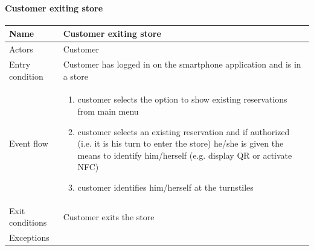 \paragraph{Customer exiting store}
\begin{flushleft}
	\begin{tabular} { | m{3cm} | m{10cm} | }
		\hline
		Name & Customer exiting store\\
		\hline
		Actors & Customer\\
		\hline
		Entry condition & Customer has logged in on the smartphone application and is in a store\\
		\hline
		Event flow & \begin{enumerate}
			\item customer selects the option to show existing reservations from main menu
			\item customer selects an existing reservation and if authorized (i.e. it is his turn to enter the store) he/she is given the means to identify him/herself (e.g. display QR or activate NFC)
			\item customer identifies him/herself at the turnstiles
		\end{enumerate}\\
		\hline
		Exit conditions & Customer exits the store\\
		\hline
		Exceptions & \\
		\hline
	\end{tabular}
\end{flushleft}

